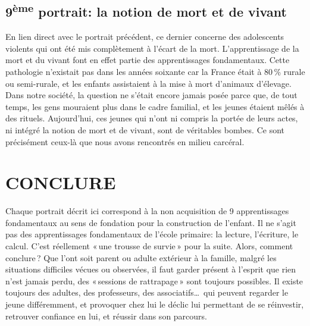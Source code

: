 \documentclass[11pt]{article} %
\begin{document}
\subsection{9\textsuperscript{ème} portrait: la notion de mort et de vivant }

  En lien direct avec le portrait précédent, ce dernier concerne des adolescents violents qui ont été mis complètement à l'écart de la mort. L'apprentissage de la mort et du vivant font en effet partie des apprentissages fondamentaux. Cette pathologie n'existait pas dans les années soixante car la France était à 80\,\% rurale ou semi-rurale, et les enfants assistaient à la mise à mort d'animaux d'élevage. Dans notre société, la question ne s'était encore jamais posée parce que, de tout temps, les gens mouraient plus dans le cadre familial, et les jeunes étaient mêlés à des rituels.\newline
  Aujourd'hui, ces jeunes qui n'ont ni compris la portée de leurs actes, ni intégré la notion de mort et de vivant, sont de véritables bombes. Ce sont précisément ceux-là que nous avons rencontrés en milieu carcéral.


\section{CONCLURE }

Chaque portrait décrit ici correspond à la non acquisition de 9 apprentissages fondamentaux au sens de fondation pour la construction de l'enfant. Il ne s'agit pas des apprentissages fondamentaux de l'école primaire: la lecture, l'écriture, le calcul. C'est réellement « une trousse de survie » pour la suite. Alors, comment conclure ?\newline
Que l'ont soit parent ou adulte extérieur à la famille, malgré les situations difficiles vécues ou observées, il faut garder présent à l'esprit que rien n'est jamais perdu, des « sessions de rattrapage » sont toujours possibles. Il existe toujours des adultes, des professeurs, des associatifs\dots\ qui peuvent regarder le jeune différemment, et provoquer chez lui le déclic lui permettant de se réinvestir, retrouver confiance en lui, et réussir dans son parcours.
\end{document}
